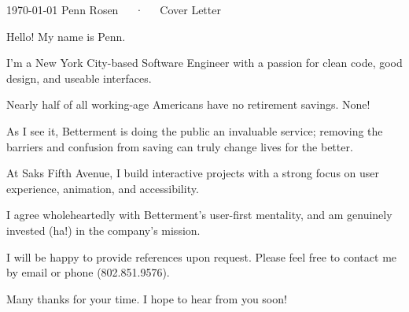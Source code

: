 \documentclass[12pt, letterpaper]{awesome-cv}
\newcommand{\companyname}{Betterment}
\begin{document}
\makecvheader[R]

\makecvfooter
  {\today}
  {Penn Rosen~~~·~~~Cover Letter}
  {}

\makelettertitle

\begin{cvletter}

Hello! My name is Penn.

I'm a New York City-based Software Engineer with a passion for clean code, good design, and useable interfaces.

Nearly half of all working-age Americans have no retirement savings. None!

As I see it, \companyname{} is doing the public an invaluable service; removing the barriers and confusion from saving can truly change lives for the better.


At Saks Fifth Avenue, I build interactive projects with a strong focus on user experience, animation, and accessibility.

I agree wholeheartedly with \companyname's user-first mentality, and am genuinely invested (ha!) in the company's mission. 


I will be happy to provide references upon request. Please feel free to contact me by email or phone (802.851.9576).

Many thanks for your time. I hope to hear from you soon! 

\end{cvletter}


\makeletterclosing
\end{document}
